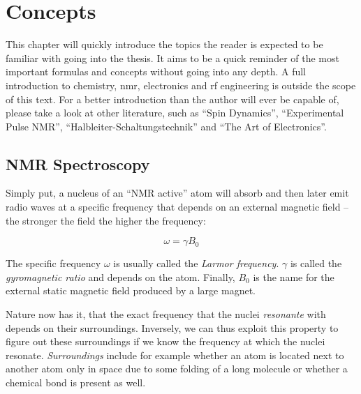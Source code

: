 \chapter{Concepts}

This chapter will quickly introduce the topics the reader is expected to be familiar with going into the thesis. It aims to be a quick reminder of the most important formulas and concepts without going into any depth. A full introduction to chemistry, \acrshort{nmr}, electronics and \acrshort{rf} engineering is outside the scope of this text. For a better introduction than the author will ever be capable of, please take a look at other literature, such as \enquote{Spin Dynamics}, \enquote{Experimental Pulse NMR}, \enquote{Halbleiter-Schaltungstechnik} and \enquote{The Art of Electronics}.

\section{NMR Spectroscopy}
Simply put, a nucleus of an \enquote{NMR active} atom will absorb and then later emit radio waves at a specific frequency that depends on an external magnetic field -- the stronger the field the higher the frequency:

\[
    \omega = \gamma{}B_0
\]

The specific frequency \(\omega\) is usually called the \emph{Larmor frequency}. \(\gamma\) is called the \emph{gyromagnetic ratio} and depends on the atom. Finally, \(B_0\) is the name for the external static magnetic field produced by a large magnet.

Nature now has it, that the exact frequency that the nuclei \emph{resonante} with depends on their surroundings. Inversely, we can thus exploit this property to figure out these surroundings if we know the frequency at which the nuclei resonate. \emph{Surroundings} include for example whether an atom is located next to another atom only in space due to some folding of a long molecule or whether a chemical bond is present as well.

